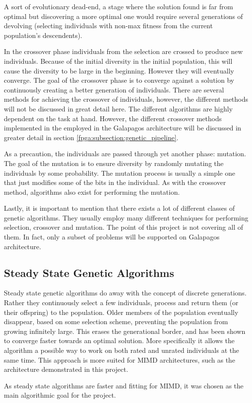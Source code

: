 A sort of evolutionary dead-end, a stage where the solution found is far from optimal but discovering a more optimal one would require several generations of devolving (selecting individuals with non-max fitness from the current population's descendents).

In the crossover phase individuals from the selection are crossed to produce new individuals.
Because of the initial diversity in the initial population, this will cause the diversity to be large in the beginning.
However they will eventually converge.
The goal of the crossover phase is to converge against a solution by continuously creating a better generation of individuals.
There are several methods for achieving the crossover of individuals, however, the different methods will not be discussed in great detail here.
The different algorithms are highly dependent on the task at hand.
However, the different crossover methods implemented in the employed in the Galapagos architecture will be discussed in greater detail in section \vref{fpga:subsection:genetic_pipeline}.

As a precaution, the individuals are passed through yet another phase: mutation.
The goal of the mutation is to ensure diversity by randomly mutating the individuals by some probability.
The mutation process is usually a simple one that just modifies some of the bits in the individual.
As with the crossover method, algorithms also exist for performing the mutation.


Lastly, it is important to mention that there exists a lot of different classes of genetic algorithms.
They usually employ many different techniques for performing selection, crossover and mutation.
The point of this project is not covering all of them.
In fact, only a subset of problems will be supported on Galapagos architecture.



\subsection{Steady State Genetic Algorithms}
Steady state genetic algorithms do away with the concept of discrete generations.
Rather they continuously select a few individuals, process and return them (or their offspring) to the population.
Older members of the population eventually disappear, based on some selection scheme, preventing the population from growing infinitely large.
This erases the generational border, and has been shown to converge faster towards an optimal solution.
More specifically it allows the algorithm a possible way to work on both rated and unrated individuals at the same time.\cite{steady-state}
This approach is more suited for MIMD architectures, such as the architecture demonstrated in this project.

As steady state algorithms are faster and fitting for MIMD, it was chosen as the main algorithmic goal for the project.


